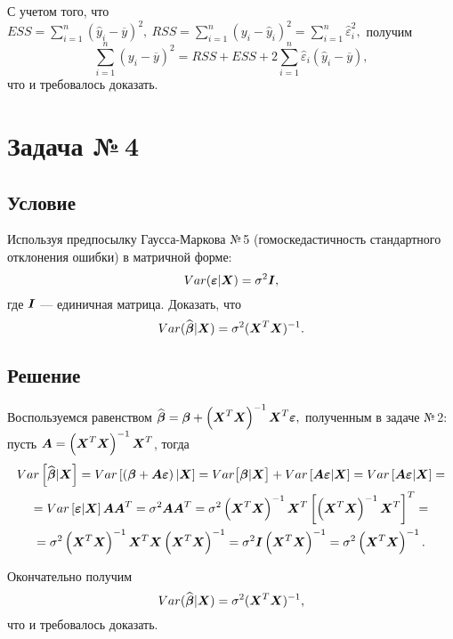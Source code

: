 \documentclass[12pt, a4paper]{article}
\renewcommand{\vec}[1]{\text{\mathversion{bold}${#1}$}}%
\newcommand{\eps}{\varepsilon}
\begin{document}
			\noindent
			С учетом того, что 			
			$
				ESS = \displaystyle\sum_{i=1}^{n}(\widehat{y}_i - \overline{y})^2, \ 
				RSS = \displaystyle\sum_{i=1}^{n}(y_i - \widehat{y}_i)^2 = \displaystyle\sum_{i=1}^{n} \widehat{\eps}_i^2,
			$
			получим
			$$
			\sum_{i=1}^{n} \left(y_i - \overline{y}\right)^2 = RSS + ESS + 2 \sum_{i=1}^{n} \widehat{\eps}_i (\widehat{y}_i - \overline{y}),
			$$
			что и требовалось доказать.
			
			
		
		
		
	\newpage
	\section{Задача №\,4}
		
		\subsection*{Условие}
			
			Используя предпосылку Гаусса-Маркова №\,5 (гомоскедастичность стандартного отклонения ошибки) в матричной форме: 
			$$
				Var(\vec \eps | \vec X) = \sigma^2 \vec I,
			$$
			где $\vec I$ --- единичная матрица.	
			Доказать, что
			$$
				Var(\widehat{\vec \beta} | \vec X) = \sigma^2 (\vec X^T \vec X)^{-1}.
			$$
		
		\subsection*{Решение}
			
			Воспользуемся равенством 
			$
				\widehat{\vec \beta} = \vec \beta 
				+ \left( \vec X^T \vec X \right)^{-1} \vec X^T {\vec{\eps}},
			$
			полученным в задаче №\,2: пусть $\vec A = \left( \vec X^T \vec X \right)^{-1} \vec X^T$, тогда 
			\begin{multline*}
				Var\left[\widehat{\vec \beta} | \vec X\right] =	
				Var\left[ \left( \vec \beta 
				+ \vec A {\vec{\eps}}  \right) | \vec X \right] =	
				Var\bigl[ \vec \beta | \vec X \bigr] + 
				Var\left[\vec A {\vec{\eps}} | \vec X \right] =	
				Var\left[\vec A {\vec{\eps}} | \vec X \right]
				= \\ = 
				Var\left[ {\vec{\eps}} | \vec X \right] \vec A \vec A^T = 
				\sigma^2 \vec A \vec A^T = 
				\sigma^2 \left( \vec X^T \vec X \right)^{-1} \vec X^T \left[ \left( \vec X^T \vec X  \right)^{-1} \vec X^T \right]^T 
				= \\ = 
				\sigma^2 \left( \vec X^T \vec X \right)^{-1} \vec X^T \vec X \left( \vec X^T \vec X  \right)^{-1} =
				\sigma^2 \vec I \left( \vec X^T \vec X \right)^{-1} = \sigma^2 \left( \vec X^T \vec X \right)^{-1}.
			\end{multline*}
			
			Окончательно получим
			$$
			Var(\widehat{\vec \beta} | \vec X) = \sigma^2 (\vec X^T \vec X)^{-1},
			$$
			что и требовалось доказать.
				
		
			
			
	
\end{document}
